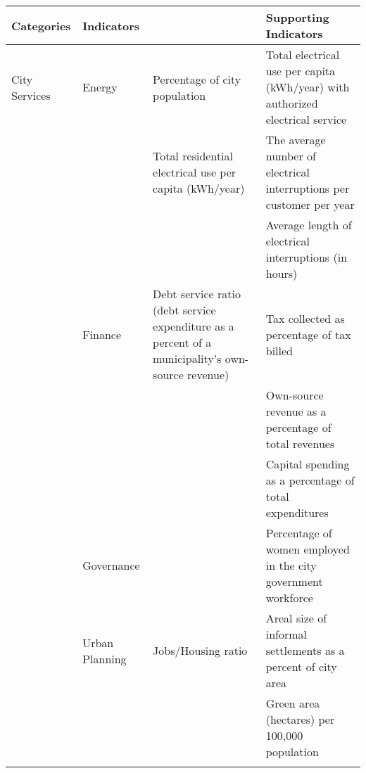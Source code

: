 \begin{landscape}
\begin{table}[th]
\begin{center}
\begin{tabular}{ >{\raggedright\arraybackslash}p{} >{\raggedright\arraybackslash}p{} >{\raggedright\arraybackslash}p{} >{\raggedright\arraybackslash}p{} } 
\hline
Categories & Indicators &  & Supporting Indicators \\
\hline
City Services & Energy & Percentage of city population & Total electrical use per capita (kWh/year)
with authorized electrical service \\
  &  & Total residential electrical use per capita (kWh/year) & The average number of electrical interruptions per customer per year \\
  &  &  & Average length of electrical interruptions (in hours) \linebreak \\
  & Finance & Debt service ratio (debt service expenditure as a percent of a municipality’s own-source revenue) & Tax collected as percentage of tax billed \\
  &  &  & Own-source revenue as a percentage of total revenues \\
  &  &  & Capital spending as a percentage of total expenditures \linebreak \\
  & Governance &  & Percentage of women employed in the city government workforce \linebreak \\
  & Urban Planning & Jobs/Housing ratio & Areal size of informal settlements as a percent of city area \\
  &  &  & Green area (hectares) per 100,000 population \\
\hline
\label{tbl:globalCityIndicatorsFacility3}
\end{tabular}
\end{center}
\end{table}


\end{landscape}

